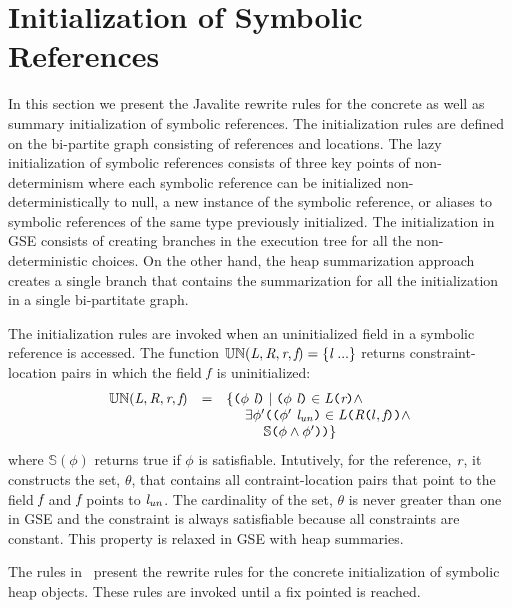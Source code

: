 \section{Initialization of Symbolic References}

In this section we present the Javalite rewrite rules for the concrete
as well as summary initialization of symbolic references. The
initialization rules are defined on the bi-partite graph consisting of
references and locations. The lazy initialization of symbolic
references consists of three key points of non-determinism where each
symbolic reference can be initialized non-deterministically to null, a
new instance of the symbolic reference, or aliases to symbolic
references of the same type previously initialized. The initialization
in GSE consists of creating branches in the execution tree for all the
non-deterministic choices. On the other hand, the heap summarization
approach creates a single branch that contains the summarization for
all the initialization in a single bi-partitate graph.





The initialization rules are invoked when an uninitialized field in a
symbolic reference is accessed. The function $\mathbb{UN}(\emph{L},
\emph{R}, \emph{r}, \emph{f}) = \{\emph{l}\ ...\}$ returns
constraint-location pairs in which the field $\emph{f}$ is
uninitialized:
\[
\begin{array}{rcl}
\mathbb{UN}(\cfgnt{L}, \cfgnt{R}, \cfgnt{r}, \cfgnt{f}) & = &\{ \lp\phi\ \cfgnt{l}\rp \mid \lp \phi\ \cfgnt{l}\rp  \in \cfgnt{L}\lp \cfgnt{r}\rp  \wedge \\
& & \ \ \ \ \exists \phi^\prime \lp \lp \phi^\prime\ \cfgnt{l}_\mathit{un}\rp  \in \cfgnt{L}\lp \cfgnt{R}\lp l,\cfgnt{f}\rp\rp \wedge \\
& & \ \ \ \ \ \ \ \ \mathbb{S}\lp \phi \wedge \phi^\prime \rp\rp\}\\
\end{array}
\]
where $\mathbb{S}(\phi)$ returns true if $\phi$ is
satisfiable. Intutively, for the reference, $\emph{r}$, it constructs
the set, $\theta$, that contains all contraint-location pairs that
point to the field $\emph{f}$ and $\emph{f}$ points to
$\emph{l}_\mathit{un}$. The cardinality of the set, $\theta$ is never
greater than one in GSE and the constraint is always satisfiable
because all constraints are constant. This property is relaxed in GSE
with heap summaries.

The rules in~ present the rewrite rules for the
concrete initialization of symbolic heap objects.  These rules are
invoked until a fix pointed is reached. 

